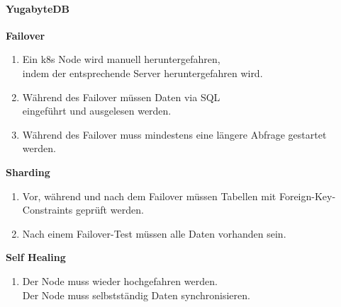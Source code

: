 \begin{flushleft}
    \paragraph{YugabyteDB}
    \begin{description}
        \item \textbf{Failover}\hfill \\
        \begin{enumerate}
            \item Ein k8s Node wird manuell heruntergefahren,\\indem der entsprechende Server heruntergefahren wird.
            \item Während des Failover müssen Daten via SQL\\eingeführt und ausgelesen werden.
            \item Während des Failover muss mindestens eine längere Abfrage gestartet werden.
        \end{enumerate}
        \item \textbf{Sharding}\hfill \\
        \begin{enumerate}[resume]
            \item Vor, während und nach dem Failover müssen Tabellen mit Foreign-Key-Constraints geprüft werden.
            \item Nach einem Failover-Test müssen alle Daten vorhanden sein.
        \end{enumerate}
        \item \textbf{Self Healing}\hfill \\
        \begin{enumerate}[resume]
            \item Der Node muss wieder hochgefahren werden.\\Der Node muss selbstständig Daten synchronisieren.
        \end{enumerate}
    \end{description}
\end{flushleft}
\clearpage
